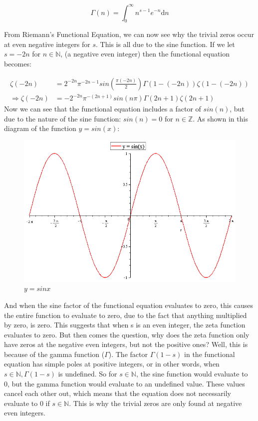 \documentclass{article}
\begin{document}
$$\Gamma(n) = \int_{0}^{\infty}n^{s-1}e^{-n} \mathrm{d}n$$

From Riemann's Functional Equation, we can now see why the trivial zeros occur at even negative integers for $s$. This is all due to the sine function. If we let $s = -2n$ for $n \in \mathbb{N}$, (a negative even integer) then the functional equation becomes:

\begin{align*}
    \zeta(-2n) &= 2^{-2n}\pi^{-2n-1}sin\left(\frac{\pi(-2n)}{2}\right)\Gamma(1-(-2n))\zeta(1-(-2n))\\
    \Rightarrow \zeta(-2n) &= -2^{-2n}\pi^{-(2n+1)}sin(n \pi)\Gamma(2n+1)\zeta(2n+1)
\end{align*}
Now we can see that the functional equation includes a factor of $sin(n)$, but due to the nature of the sine function: $sin(n) = 0$ for $n \in  \mathbb{Z}$.  As shown in this diagram of the function $y = sin(x)$:

\begin{figure}[h]
    \centering
    \includegraphics[scale=0.3]{sinx-graph}
    \caption{$y=sin x$}
\end{figure}

And when the sine factor of the functional equation evaluates to zero, this causes the entire function to evaluate to zero, due to the fact that anything multiplied by zero, is zero. This suggests that when s is an even integer, the zeta function evaluates to zero. But then comes the question, why does the zeta function only have zeros at the negative even integers, but not the positive ones? Well, this is because of the gamma function ($\Gamma$).  The factor $\Gamma(1-s)$ in the functional equation has simple poles at positive integers, or in other words, when $s \in \mathbb{N}, \Gamma(1-s)$ is undefined. So for $s \in \mathbb{N}$, the sine function would evaluate to 0, but the gamma function would evaluate to an undefined value. These values cancel each other out, which means that the equation does not necessarily evaluate to $0$ if  $s \in \mathbb{N}$. This is why the trivial zeros are only found at negative even integers.
\end{document}
